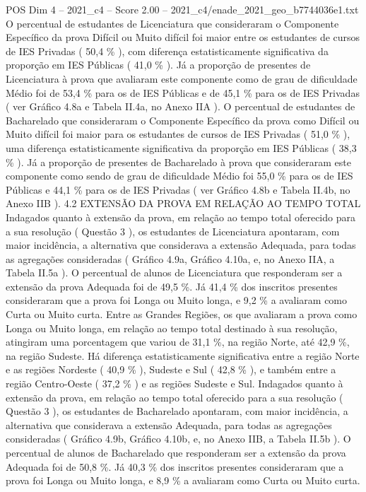 \begin{textsample}{POS Dim 4 – 2021\_c4 – Score 2.00 – 2021\_c4/enade\_2021\_geo\_b7744036e1.txt}
O percentual de estudantes de Licenciatura que consideraram o Componente Específico da prova Difícil ou Muito difícil foi maior entre os estudantes de cursos de IES Privadas ( 50,4 \% ), com diferença estatisticamente significativa da proporção em IES Públicas ( 41,0 \% ).
Já a proporção de presentes de Licenciatura à prova que avaliaram este componente como de grau de dificuldade Médio foi de 53,4 \% para os de IES Públicas e de 45,1 \% para os de IES Privadas ( ver Gráfico 4.8a e Tabela II.4a, no Anexo IIA ).
O percentual de estudantes de Bacharelado que consideraram o Componente Específico da prova como Difícil ou Muito difícil foi maior para os estudantes de cursos de IES Privadas ( 51,0 \% ), uma diferença estatisticamente significativa da proporção em IES Públicas ( 38,3 \% ).
Já a proporção de presentes de Bacharelado à prova que consideraram este componente como sendo de grau de dificuldade Médio foi 55,0 \% para os de IES Públicas e 44,1 \% para os de IES Privadas ( ver Gráfico 4.8b e Tabela II.4b, no Anexo IIB ). 4.2 EXTENSÃO DA PROVA EM RELAÇÃO AO TEMPO TOTAL Indagados quanto à extensão da prova, em relação ao tempo total oferecido para a sua resolução ( Questão 3 ), os estudantes de Licenciatura apontaram, com maior incidência, a alternativa que considerava a extensão Adequada, para todas as agregações consideradas ( Gráfico 4.9a, Gráfico 4.10a, e, no Anexo IIA, a Tabela II.5a ).
O percentual de alunos de Licenciatura que responderam ser a extensão da prova Adequada foi de 49,5 \%.
Já 41,4 \% dos inscritos presentes consideraram que a prova foi Longa ou Muito longa, e 9,2 \% a avaliaram como Curta ou Muito curta.
Entre as Grandes Regiões, os que avaliaram a prova como Longa ou Muito longa, em relação ao tempo total destinado à sua resolução, atingiram uma porcentagem que variou de 31,1 \%, na região Norte, até 42,9 \%, na região Sudeste.
Há diferença estatisticamente significativa entre a região Norte e as regiões Nordeste ( 40,9 \% ), Sudeste e Sul ( 42,8 \% ), e também entre a região Centro-Oeste ( 37,2 \% ) e as regiões Sudeste e Sul.
Indagados quanto à extensão da prova, em relação ao tempo total oferecido para a sua resolução ( Questão 3 ), os estudantes de Bacharelado apontaram, com maior incidência, a alternativa que considerava a extensão Adequada, para todas as agregações consideradas ( Gráfico 4.9b, Gráfico 4.10b, e, no Anexo IIB, a Tabela II.5b ).
O percentual de alunos de Bacharelado que responderam ser a extensão da prova Adequada foi de 50,8 \%.
Já 40,3 \% dos inscritos presentes consideraram que a prova foi Longa ou Muito longa, e 8,9 \% a avaliaram como Curta ou Muito curta.

\end{textsample}
